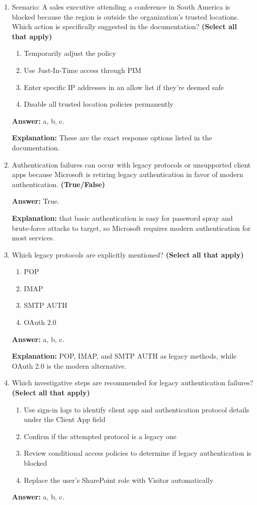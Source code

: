 \documentclass[10pt]{article}
\begin{document}
\begin{enumerate}[leftmargin=*]
\textbf{Explanation:} All four steps are listed in the location/IP troubleshooting scenario.

\item Scenario: A sales executive attending a conference in South America is blocked because the region is outside the organization’s trusted locations. Which action is specifically suggested in the documentation? \textbf{(Select all that apply)}
\begin{enumerate}[label=\alph*., leftmargin=1.5em]
\item Temporarily adjust the policy
\item Use Just-In-Time access through PIM
\item Enter specific IP addresses in an allow list if they’re deemed safe
\item Disable all trusted location policies permanently
\end{enumerate}
\textbf{Answer:} a, b, c.

\textbf{Explanation:} These are the exact response options listed in the documentation.

\item Authentication failures can occur with legacy protocols or unsupported client apps because Microsoft is retiring legacy authentication in favor of modern authentication. \textbf{(True/False)}

\textbf{Answer:} True.

\textbf{Explanation:} that basic authentication is easy for password spray and brute-force attacks to target, so Microsoft requires modern authentication for most services.

\item Which legacy protocols are explicitly mentioned? \textbf{(Select all that apply)}
\begin{enumerate}[label=\alph*., leftmargin=1.5em]
\item POP
\item IMAP
\item SMTP AUTH
\item OAuth 2.0
\end{enumerate}
\textbf{Answer:} a, b, c.

\textbf{Explanation:} POP, IMAP, and SMTP AUTH as legacy methods, while OAuth 2.0 is the modern alternative.

\item Which investigative steps are recommended for legacy authentication failures? \textbf{(Select all that apply)}
\begin{enumerate}[label=\alph*., leftmargin=1.5em]
\item Use sign-in logs to identify client app and authentication protocol details under the Client App field
\item Confirm if the attempted protocol is a legacy one
\item Review conditional access policies to determine if legacy authentication is blocked
\item Replace the user’s SharePoint role with Visitor automatically
\end{enumerate}
\textbf{Answer:} a, b, c.


\end{enumerate}
\end{document}
